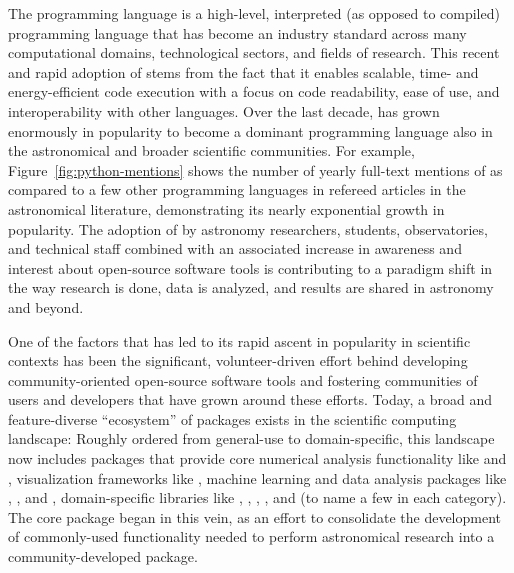 \documentclass[modern]{aastex631}
\newcommand{\secauthor}[1]{{\color{blue}Author:~\textit{#1}}}
\begin{document}

The \python programming language is a high-level, interpreted (as opposed to
compiled) programming language that has become an industry standard across many
computational domains, technological sectors, and fields of research.
This recent and rapid adoption of \python stems from the fact that it enables
scalable, time- and energy-efficient code execution \citep[e.g.,][]{Augier:2021}
with a focus on code readability, ease of use, and interoperability with other
languages.
Over the last decade, \python has grown enormously in popularity to become a
dominant programming language also in the astronomical and broader scientific
communities.
For example, Figure~\ref{fig:python-mentions} shows the number of yearly
full-text mentions of \python as compared to a few other programming languages
in refereed articles in the astronomical literature, demonstrating its nearly
exponential growth in popularity.
The adoption of \python by astronomy researchers, students, observatories, and
technical staff combined with an associated increase in awareness and interest
about open-source software tools is contributing to a paradigm shift in the way
research is done, data is analyzed, and results are shared in astronomy and
beyond.

One of the factors that has led to its rapid ascent in popularity in scientific
contexts has been the significant, volunteer-driven effort behind developing
community-oriented open-source software tools and fostering communities of users
and developers that have grown around these efforts.
Today, a broad and feature-diverse ``ecosystem'' of packages exists in the
\python scientific computing landscape: Roughly ordered from general-use to
domain-specific, this landscape now includes packages that provide core
numerical analysis functionality like  \citep{numpy:nature} and
 \citep{scipy}, visualization frameworks like
 \citep{matplotlib}, machine learning and data analysis
packages like  \citep{tensorflow}, 
\citep{Salvatier:2016}, and  \citep{emcee}, domain-specific
libraries like  \citep{yt:2011}, 
\citep{plasmapy},  \citep{sunpy:apj}, 
\citep{biopython}, and  \citep{sympy} (to name a few in each
category).
The \astropypkg \citep{astropy:2013, astropy:2018} core package began in this
vein, as an effort to consolidate the development of commonly-used functionality
needed to perform astronomical research into a community-developed \python
package.
\end{document}
